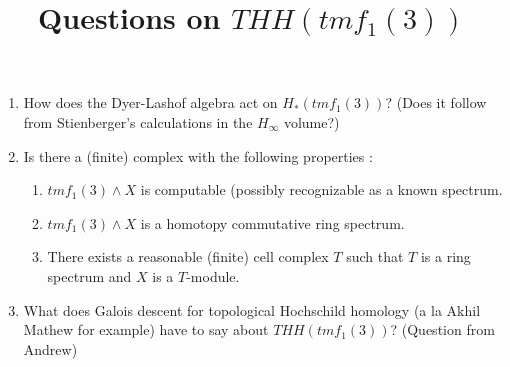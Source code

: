 \documentclass[11pt, oneside]{article}   	%
\title{Questions on $THH(tmf_1(3))$ }
\date{}							%
\begin{document}
\maketitle
\begin{enumerate}
	\item{} How does the Dyer-Lashof algebra act on $H_*(tmf_1(3))$? (Does it follow from Stienberger's calculations in the $H_{\infty}$ volume?) 
	\item{} Is there a (finite) complex with the following properties :
		\begin{enumerate}
			\item{} $tmf_1(3)\wedge X$ is computable (possibly recognizable as a known spectrum.  
			\item{} $tmf_1(3)\wedge X$ is a homotopy commutative ring spectrum. 
			\item{} There exists a reasonable (finite) cell complex $T$ such that $T$ is a ring spectrum and $X$ is a $T$-module. 
		\end{enumerate}
	\item{} What does Galois descent for topological Hochschild homology (a la Akhil Mathew for example) have to say about $THH(tmf_1(3))$?  (Question from Andrew) 
\end{enumerate}
\end{document}
